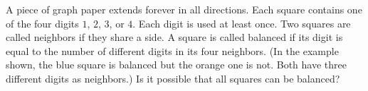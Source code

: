 A piece of graph paper extends forever in all directions. Each square contains  one of the four digits $1$, $2$, $3$, or $4$. Each digit is used at least once. Two squares are called neighbors if they share a side. A square is called balanced if its digit is equal to the number of different digits in its four neighbors. (In the example shown, the blue square is balanced but the orange one is not. Both have three different digits as neighbors.) Is it possible that all squares can be balanced?
